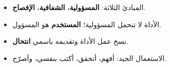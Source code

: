 \documentclass[a4paper]{article}
\begin{document}
\begin{khulasa}
\begin{itemize}
    \item المبادئ الثلاثة: \textbf{المسؤولية}، \textbf{الشفافية}، \textbf{الإفصاح}.
    \item الأداة لا تتحمل المسؤولية؛ \textbf{المستخدم} هو المسؤول.
    \item نسخ عمل الأداة وتقديمه باسمي \textbf{انتحال}.
    \item الاستعمال الجيد: أفهم، أتحقق، أكتب بنفسي، وأصرّح.
\end{itemize}
\end{khulasa}
\end{document}
